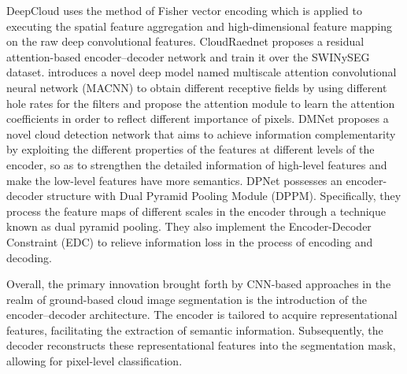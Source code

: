 \documentclass{article}
\begin{document}
DeepCloud \citep{DeepCloud} uses the method of Fisher vector encoding which is applied to executing the spatial feature aggregation and high-dimensional feature mapping on the raw deep convolutional features.
CloudRaednet \citep{shi2022cloudraednet} proposes a residual attention-based encoder–decoder network and train it over the SWINySEG dataset.
\citep{MACNN} introduces a novel deep model named multiscale attention convolutional neural network (MACNN) to obtain different receptive fields by using different hole rates for the filters and propose the attention module to learn the attention coefficients in order to reflect different importance of pixels.
DMNet \citep{DMNet} proposes a novel cloud detection network that aims to achieve information complementarity by exploiting the different properties of the features at different levels of the encoder, so as to strengthen the detailed information of high-level features and make the low-level features have more semantics.
DPNet \citep{DPNet} possesses an encoder-decoder structure
with Dual Pyramid Pooling Module (DPPM). Specifically, they process the feature maps of different scales in the encoder through a technique known as dual pyramid pooling. They also implement the Encoder-Decoder Constraint (EDC) to relieve information loss in the process of encoding and decoding.

Overall, the primary innovation brought forth by CNN-based approaches in the realm of ground-based cloud image segmentation is the introduction of the encoder–decoder architecture. The encoder is tailored to acquire representational features, facilitating the extraction of semantic information. Subsequently, the decoder reconstructs these representational features into the segmentation mask, allowing for pixel-level classification.
\end{document}
